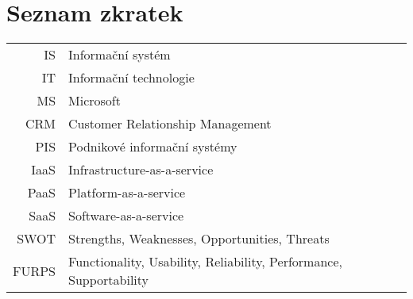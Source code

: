 \chapter{Seznam zkratek}
	
\begin{tabular}{rl}
IS & Informační systém\\
IT & Informační technologie\\
MS & Microsoft\\
CRM & Customer Relationship Management\\
PIS & Podnikové informační systémy\\
IaaS & Infrastructure-as-a-service\\
PaaS & Platform-as-a-service\\
SaaS & Software-as-a-service\\
SWOT & Strengths, Weaknesses, Opportunities, Threats\\
FURPS & Functionality, Usability, Reliability, Performance, Supportability\\
\end{tabular}
